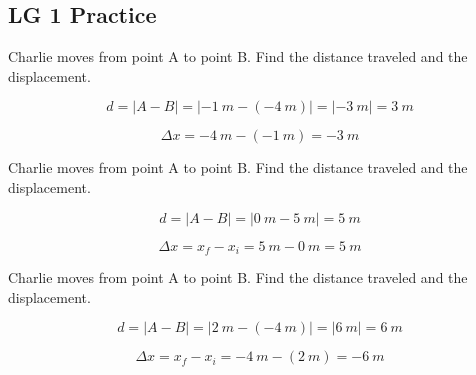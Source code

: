 \documentclass[]{exam}
\begin{document}
\subsection*{LG 1 Practice}

\begin{questions}

\question
Charlie moves from point A to point B. Find the distance traveled and the displacement.


\begin{solution}
\begin{equation*}
    d = \left|A - B\right| = \left|-\SI{1}{m} - (-\SI{4}{m})\right| = \left|\SI{-3}{m}\right| = \boxed{\SI{3}{m}}
\end{equation*}

\begin{equation*}
    \Delta x = \SI{-4}{m} - (\SI{-1}{m}) = \boxed{\SI{-3}{m}}
\end{equation*}
\end{solution}

\question
Charlie moves from point A to point B. Find the distance traveled and the displacement.


\begin{solution}
\begin{equation*}
    d = \left|A - B\right| = \left|\SI{0}{m} - \SI{5}{m}\right| = \boxed{\SI{5}{m}}
\end{equation*}

\begin{equation*}
    \Delta x = x_f - x_i = \SI{5}{m} - \SI{0}{m} = \boxed{\SI{5}{m}}
\end{equation*}
\end{solution}

\question
Charlie moves from point A to point B. Find the distance traveled and the displacement.


\begin{solution}
\begin{equation*}
    d = \left|A - B\right| = \left|\SI{2}{m} - (-\SI{4}{m})\right| = \left|\SI{6}{m}\right| = \boxed{\SI{6}{m}}
\end{equation*}

\begin{equation*}
    \Delta x = x_f - x_i = -\SI{4}{m} - (\SI{2}{m}) = \boxed{\SI{-6}{m}}
\end{equation*}
\end{solution}


\end{questions}
\end{document}
